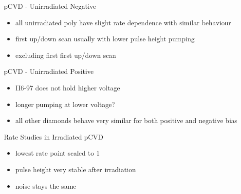\begin{frame}{pCVD - Unirradiated Negative}
 
	
	\vspace*{-20pt}\vspace*{-10pt}
	
	\begin{itemize} \itemfill
		\item all unirradiated poly have slight rate dependence with similar behaviour
		\item first up/down scan usually with lower pulse height \ra pumping
		\item \ra excluding first first up/down scan
	\end{itemize}
 
\end{frame}
\begin{frame}{pCVD - Unirradiated Positive}
 
	
	\vspace*{-20pt}\vspace*{-10pt}
	
	\begin{itemize} \itemfill
		\item II6-97 does not hold higher voltage
		\item longer pumping at lower voltage?
		\item all other diamonds behave very similar for both positive and negative bias
	\end{itemize}
 
\end{frame}
\begin{frame}{Rate Studies in Irradiated pCVD}

	\vspace*{-15pt}
	
	\begin{itemize}\itemfill
		\item lowest rate point scaled to 1
		\item pulse height very stable after irradiation
		\item noise stays the same
	\end{itemize}

\end{frame}